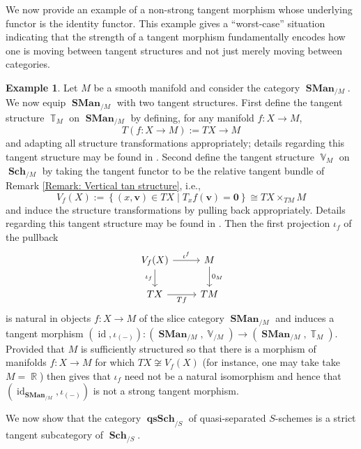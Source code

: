\documentclass{amsart}
\theoremstyle{definition}
\newtheorem{example}[equation]{Example}
\DeclareMathOperator{\Tbb}{\mathbb{T}}
\DeclareMathOperator{\Vbb}{\mathbb{V}}
\DeclareMathOperator{\qsSch}{\mathbf{qsSch}}
\DeclareMathOperator{\id}{id}
\DeclareMathOperator{\R}{\mathbb{R}}
\DeclareMathOperator{\SMan}{\mathbf{SMan}}
\DeclareMathOperator{\Sch}{\mathbf{Sch}}
\numberwithin{equation}{subsection}
\begin{document}
We now provide an example of a non-strong tangent morphism whose underlying functor is the identity functor. This example gives a ``worst-case'' situation indicating that the strength of a tangent morphism fundamentally encodes how one is moving between tangent structures and not just merely moving between categories.
\begin{example}\label{Example: Identity functor not strong tangent morphism}
Let $M$ be a smooth manifold and consider the category $\SMan_{/M}$. We now equip $\SMan_{/M}$ with two tangent structures. First define the tangent structure $\Tbb_M$ on $\SMan_{/M}$ by defining, for any manifold $f:X \to M$,
\[
T(f:X \to M) := TX \to M
\]
and adapting all structure transformations appropriately; details regarding this tangent structure may be found in \cite[Proposition 2.5]{GeoffRobinDiffStruct}. Second define the tangent structure $\Vbb_M$ on $\Sch_{/M}$ by taking the tangent functor to be the relative tangent bundle of Remark \ref{Remark: Vertical tan structure}, i.e.,
\[
V_f(X) := \left\lbrace (x,\mathbf{v}) \in TX \; | \; T_xf(\mathbf{v}) = \mathbf{0} \right\rbrace \cong TX \times_{TM} M
\]
and induce the structure transformations by pulling back appropriately. Details regarding this tangent structure may be found in \cite[Proposition 7.10]{PronkVooys}. Then the first projection $\iota_f$ of the pullback
\[
\begin{tikzcd}
V_f(X) \ar[r]{}{\iota^f} \ar[d, swap]{}{\iota_f} & M \ar[d]{}{0_M} \\
TX \ar[r, swap]{}{Tf} & TM
\end{tikzcd}
\]
is natural in objects $f:X \to M$ of the slice category $\SMan_{/M}$ and induces a tangent morphism $(\id,\iota_{(-)}):(\SMan_{/M},\Vbb_{/M}) \to (\SMan_{/M},\Tbb_{M}).$ Provided that $M$ is sufficiently structured so that there is a morphism of manifolds $f:X \to M$ for which $TX \not\cong V_f(X)$ (for instance, one may take take $M = \R$) then gives that $\iota_f$ need not be a natural isomorphism and hence that $(\id_{\SMan_{/M}},\iota_{(-)})$ is not a strong tangent morphism.
\end{example}

We now show that the category $\qsSch_{/S}$ of quasi-separated $S$-schemes is a strict tangent subcategory of $\Sch_{/S}$.
\end{document}

